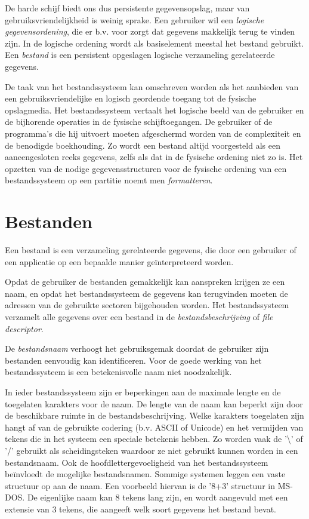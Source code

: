 De harde schijf biedt ons dus persistente gegevensopslag, maar
van gebruiksvriendelijkheid is weinig sprake. Een gebruiker wil een
\emph{logische gegevensordening}, die er b.v. voor zorgt
dat gegevens makkelijk terug te vinden zijn. In de logische ordening
wordt als basiselement meestal het bestand gebruikt. Een
\emph{bestand} is een persistent opgeslagen logische
verzameling gerelateerde gegevens.

De taak van het bestandssysteem kan omschreven worden als het
aanbieden van een gebruiksvriendelijke en logisch geordende toegang
tot de fysische opslagmedia. Het bestandssysteem vertaalt het logische
beeld van de gebruiker en de bijhorende operaties in de fysische
schijftoegangen. De gebruiker of de programma's die hij uitvoert
moeten afgeschermd worden van de complexiteit en de benodigde
boekhouding. Zo wordt een bestand altijd voorgesteld als een
aaneengesloten reeks gegevens, zelfs als dat in de fysische ordening
niet zo is. Het opzetten van de nodige gegevensstructuren voor de
fysische ordening van een bestandssysteem op een partitie noemt men
\emph{formatteren}.

\section{Bestanden}

Een bestand is een verzameling gerelateerde gegevens, die door een
gebruiker of een applicatie op een bepaalde manier ge\"interpreteerd
worden.

Opdat de gebruiker de bestanden gemakkelijk kan aanspreken krijgen
ze een naam, en opdat het bestandssysteem de gegevens kan terugvinden
moeten de adressen van de gebruikte sectoren bijgehouden worden. Het
bestandssysteem verzamelt alle gegevens over een bestand in de
\emph{bestandsbeschrijving} of \emph{file
descriptor}.

De \emph{bestandsnaam} verhoogt het gebruiksgemak
doordat de gebruiker zijn bestanden eenvoudig kan identificeren. Voor de
goede werking van het bestandssysteem is een betekenisvolle naam niet
noodzakelijk.

In ieder bestandssysteem zijn er beperkingen aan de maximale
lengte en de toegelaten karakters voor de naam. De lengte van de naam
kan beperkt zijn door de beschikbare ruimte in de bestandsbeschrijving.
Welke karakters toegelaten zijn hangt af van de gebruikte codering (b.v.
ASCII of Unicode) en het vermijden van tekens die in het systeem een
speciale betekenis hebben. Zo worden vaak de '\textbackslash' of '/' gebruikt als
scheidingsteken waardoor ze niet gebruikt kunnen worden in een
bestandsnaam. Ook de hoofdlettergevoeligheid van het bestandssysteem
be\"invloedt de mogelijke bestandsnamen. Sommige systemen leggen een vaste
structuur op aan de naam. Een voorbeeld hiervan is de '8+3' structuur in
MS-DOS. De eigenlijke naam kan 8 tekens lang zijn, en wordt aangevuld
met een extensie van 3 tekens, die aangeeft welk soort gegevens het
bestand bevat.

